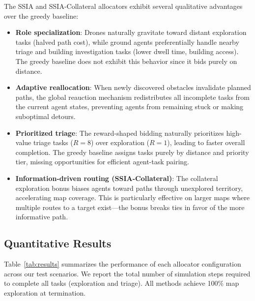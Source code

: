 \documentclass[conference]{IEEEtran}
\begin{document}
The SSIA and SSIA-Collateral allocators exhibit several qualitative advantages over the greedy baseline:
\begin{itemize}
    \item \textbf{Role specialization}: Drones naturally gravitate toward distant exploration tasks (halved path cost), while ground agents preferentially handle nearby triage and building investigation tasks (lower dwell time, building access). The greedy baseline does not exhibit this behavior since it bids purely on distance.
    \item \textbf{Adaptive reallocation}: When newly discovered obstacles invalidate planned paths, the global reauction mechanism redistributes all incomplete tasks from the current agent states, preventing agents from remaining stuck or making suboptimal detours.
    \item \textbf{Prioritized triage}: The reward-shaped bidding naturally prioritizes high-value triage tasks ($R=8$) over exploration ($R=1$), leading to faster overall completion. The greedy baseline assigns tasks purely by distance and priority tier, missing opportunities for efficient agent-task pairing.
    \item \textbf{Information-driven routing (SSIA-Collateral)}: The collateral exploration bonus biases agents toward paths through unexplored territory, accelerating map coverage. This is particularly effective on larger maps where multiple routes to a target exist---the bonus breaks ties in favor of the more informative path.
\end{itemize}

\subsection{Quantitative Results}

Table~\ref{tab:results} summarizes the performance of each allocator configuration across our test scenarios. We report the total number of simulation steps required to complete all tasks (exploration and triage). All methods achieve 100\% map exploration at termination.
\end{document}
